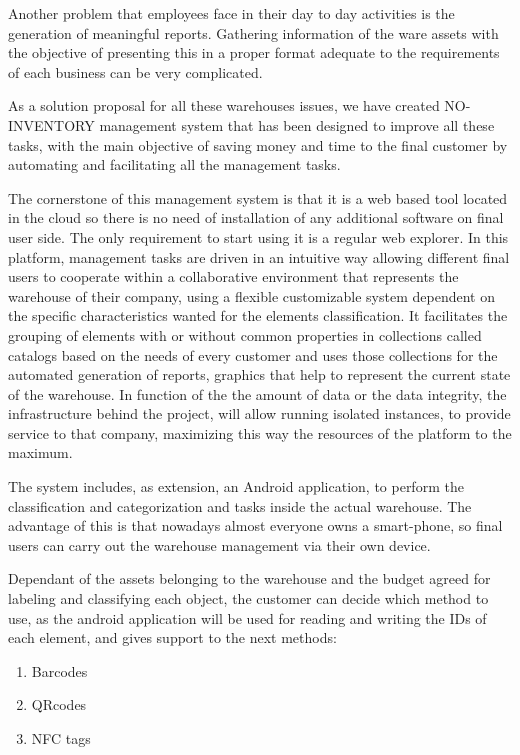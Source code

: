 Another problem that employees face in their day to day activities is the generation of meaningful reports. Gathering information of the ware assets with the objective of presenting this in a proper format adequate to the requirements of each business can be very complicated.


As a solution proposal for all these warehouses issues, we have created NO-INVENTORY management system that has been designed to improve all these tasks, with the main objective of saving money and time to the final customer by automating and facilitating all the management tasks.


The cornerstone of this management system is that it is a web based tool located in the cloud so there is no need of installation of any additional software on final user side. The only requirement to start using it is a regular web explorer. In this platform, management tasks are driven in an intuitive way allowing different final users to cooperate within a collaborative environment that represents the warehouse of their company, using a flexible customizable system dependent on the specific characteristics wanted for the elements classification. It facilitates the grouping of elements with or without common properties in collections called catalogs based on the needs of every customer and uses those collections for the automated generation of reports, graphics that help to represent the current state of the warehouse. In function of the the amount of data or the data integrity, the infrastructure behind the project, will allow running isolated instances, to provide service to that company, maximizing this way the resources of the platform to the maximum.


The system includes, as extension, an Android application, to perform the classification and categorization and tasks inside the actual warehouse. The advantage of this is that nowadays almost everyone owns a smart-phone, so final users can carry out the warehouse management via their own device.

Dependant of the assets belonging to the warehouse and the budget agreed for labeling and classifying each object, the customer can decide which method to use, as the android application will be used for reading and writing the IDs of each element, and gives support to the next methods:


\begin{enumerate}
\item Barcodes
\item QRcodes
\item NFC tags
\end{enumerate}

